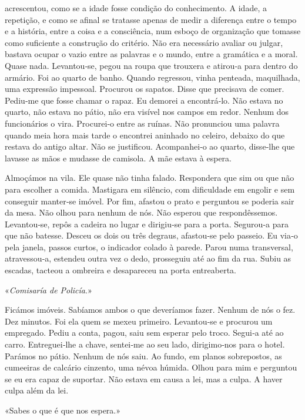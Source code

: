 acrescentou, como se a idade fosse condição do conhecimento. A idade, a
repetição, e como se afinal se tratasse apenas de medir a diferença
entre o tempo e a história, entre a coisa e a consciência, num esboço de
organização que tomasse como suficiente a construção do critério. Não
era necessário avaliar ou julgar, bastava ocupar o vazio entre as
palavras e o mundo, entre a gramática e a moral. Quase nada.
Levantou­‑se, pegou na roupa que trouxera e atirou­‑a para dentro do
armário. Foi ao quarto de banho. Quando regressou, vinha penteada,
maquilhada, uma expressão impessoal. Procurou os sapatos. Disse que
precisava de comer. Pediu­‑me que fosse chamar o rapaz. Eu demorei a
encontrá­‑lo. Não estava no quarto, não estava no pátio, não era visível
nos campos em redor. Nenhum dos funcionários o vira. Procurei­‑o entre
as ruínas. Não pronunciou uma palavra quando meia hora mais tarde o
encontrei aninhado no celeiro, debaixo do que restava do antigo altar.
Não se justificou. Acompanhei­‑o ao quarto, disse­‑lhe que lavasse as
mãos e mudasse de camisola. A mãe estava à espera.

Almoçámos na vila. Ele quase não tinha falado. Respondera que sim ou que
não para escolher a comida. Mastigara em silêncio, com dificuldade em
engolir e sem conseguir manter­‑se imóvel. Por fim, afastou o prato e
perguntou se poderia sair da mesa. Não olhou para nenhum de nós. Não
esperou que respondêssemos. Levantou­‑se, repôs a cadeira no lugar e
dirigiu­‑se para a porta. Segurou­‑a para que não batesse. Desceu os
dois ou três degraus, afastou­‑se pelo passeio. Eu via­‑o pela janela,
passos curtos, o indicador colado à parede. Parou numa transversal,
atravessou­‑a, estendeu outra vez o dedo, prosseguiu até ao fim da rua.
Subiu as escadas, tacteou a ombreira e desapareceu na porta entreaberta.

«\emph{Comisaría de Policía}.»

Ficámos imóveis. Sabíamos ambos o que deveríamos fazer. Nenhum de nós o
fez. Dez minutos. Foi ela quem se mexeu primeiro. Levantou­‑se e
procurou um empregado. Pediu a conta, pagou, saiu sem esperar pelo
troco. Segui­‑a até ao carro. Entreguei­‑lhe a chave, sentei­‑me ao seu
lado, dirigimo­‑nos para o hotel. Parámos no pátio. Nenhum de nós saiu.
Ao fundo, em planos sobrepostos, as cumeeiras de calcário cinzento, uma
névoa húmida. Olhou para mim e perguntou se eu era capaz de suportar.
Não estava em causa a lei, mas a culpa. A haver culpa além da lei.

«Sabes o que é que nos espera.»

